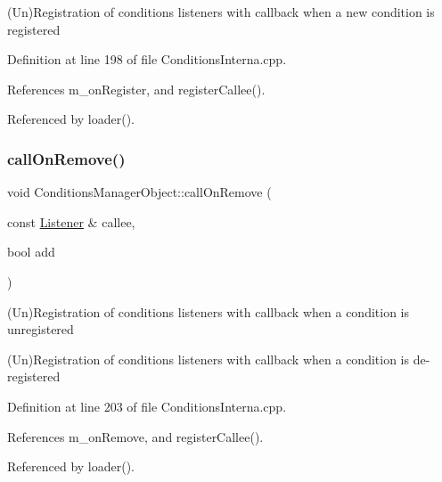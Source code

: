 (Un)Registration of conditions listeners with callback when a new condition is registered 



Definition at line 198 of file Conditions\+Interna.\+cpp.



References m\+\_\+on\+Register, and register\+Callee().



Referenced by loader().

\hypertarget{class_d_d4hep_1_1_conditions_1_1_conditions_manager_object_a4a8912db5a30d6792455aef57c223bed}{}\label{class_d_d4hep_1_1_conditions_1_1_conditions_manager_object_a4a8912db5a30d6792455aef57c223bed} 
\subsubsection{\texorpdfstring{call\+On\+Remove()}{callOnRemove()}}
{\footnotesize\ttfamily void Conditions\+Manager\+Object\+::call\+On\+Remove (\begin{DoxyParamCaption}\item[{const \hyperlink{class_d_d4hep_1_1_conditions_1_1_conditions_manager_object_ac4cd1e3a448bc1f8bae384d194f10c23}{Listener} \&}]{callee,  }\item[{bool}]{add }\end{DoxyParamCaption})}



(Un)Registration of conditions listeners with callback when a condition is unregistered 

(Un)Registration of conditions listeners with callback when a condition is de-\/registered 

Definition at line 203 of file Conditions\+Interna.\+cpp.



References m\+\_\+on\+Remove, and register\+Callee().



Referenced by loader().

\hypertarget{class_d_d4hep_1_1_conditions_1_1_conditions_manager_object_aca6c43594d93ab8773e245b8cffb0f60}{}\label{class_d_d4hep_1_1_conditions_1_1_conditions_manager_object_aca6c43594d93ab8773e245b8cffb0f60} 
